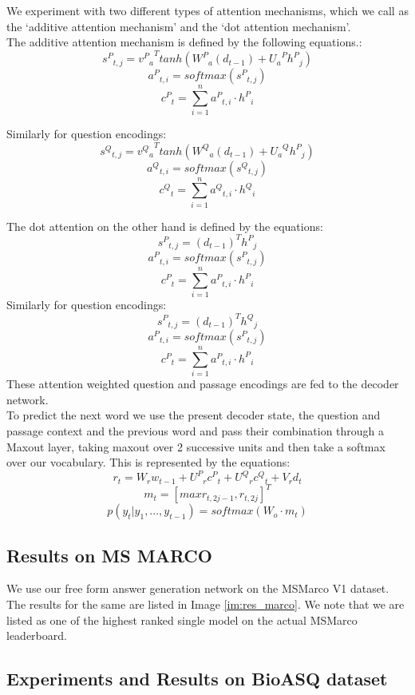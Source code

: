 We experiment with two different types of attention mechanisms, which we call as the `additive attention mechanism' and the `dot attention mechanism'. \\
The additive attention mechanism is defined by the following equations.:\\
\[  {{s^P}_{t,j}} = {{v^P}_a}^Ttanh({W^P}_a(d_{t-1}) + {U_a}^P{h^P}_j )\]
\[{a^P}_{t,i} = softmax({{s^P}_{t,j}})\]
\[{c^P}_t = \sum_{i=1}^n {a^P}_{t,i} \cdot {h^P}_i\]

Similarly for question encodings:\\
\[  {{s^Q}_{t,j}} = {{v^Q}_a}^Ttanh({W^Q}_a(d_{t-1}) + {U_a}^Q{h^P}_j )\]
\[{a^Q}_{t,i} = softmax({{s^Q}_{t,j}})\]
\[{c^Q}_t = \sum_{i=1}^n {a^Q}_{t,i} \cdot {h^Q}_i\]

The dot attention on the other hand is defined by the equations:\\
\[  {{s^P}_{t,j}} = (d_{t-1})^T{h^P}_j \]
\[{a^P}_{t,i} = softmax({{s^P}_{t,j}})\]
\[{c^P}_t = \sum_{i=1}^n {a^P}_{t,i} \cdot {h^P}_i\]
Similarly for question encodings:\\
\[  {{s^P}_{t,j}} = (d_{t-1})^T{h^Q}_j \]
\[{a^P}_{t,i} = softmax({{s^P}_{t,j}})\]
\[{c^P}_t = \sum_{i=1}^n {a^P}_{t,i} \cdot {h^P}_i\]
These attention weighted question and passage encodings are fed to the decoder network.\\
To predict the next word we use the present decoder state, the question and passage context and the previous word and pass their combination through a Maxout layer, taking maxout over 2 successive units and then take a softmax over our vocabulary. This is represented by the equations:\\
\[r_t = W_rw_{t-1} + {U^P}_r{c^P}_t + {U^Q}_r{c^Q}_t + V_rd_t \]
\[m_t = [max{r_{t,2j-1}, r_{t,2j}}]^T \]
\[p(y_t|y_1, . . . , y_{t-1}) = softmax(W_o \cdot m_t) \]


\subsection{Results on MS MARCO}
We use our free form answer generation network on the MSMarco V1 dataset. The results for the same are listed in Image \ref{im:res_marco}. We note that we are listed as one of the highest ranked single model on the actual MSMarco leaderboard.

\subsection{Experiments and Results on BioASQ dataset}

